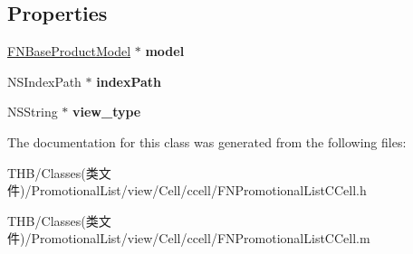 \subsection*{Properties}
\begin{DoxyCompactItemize}
\item 
\mbox{\label{interface_f_n_promotional_list_c_cell_a66afa39237f6b8c9c76ba20138274209}} 
\mbox{\hyperlink{interface_f_n_base_product_model}{F\+N\+Base\+Product\+Model}} $\ast$ {\bfseries model}
\item 
\mbox{\label{interface_f_n_promotional_list_c_cell_a19acb46695d0fa9ef13245e87481c28a}} 
N\+S\+Index\+Path $\ast$ {\bfseries index\+Path}
\item 
\mbox{\label{interface_f_n_promotional_list_c_cell_a53ca5e62e43b864fae58cb50ee2e901f}} 
N\+S\+String $\ast$ {\bfseries view\+\_\+type}
\end{DoxyCompactItemize}


The documentation for this class was generated from the following files\+:\begin{DoxyCompactItemize}
\item 
T\+H\+B/\+Classes(类文件)/\+Promotional\+List/view/\+Cell/ccell/F\+N\+Promotional\+List\+C\+Cell.\+h\item 
T\+H\+B/\+Classes(类文件)/\+Promotional\+List/view/\+Cell/ccell/F\+N\+Promotional\+List\+C\+Cell.\+m\end{DoxyCompactItemize}
